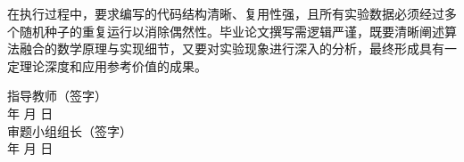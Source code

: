 \documentclass[UTF8,12pt,a4paper]{ctexart}
\begin{document}
在执行过程中，要求编写的代码结构清晰、复用性强，且所有实验数据必须经过多个随机种子的重复运行以消除偶然性。毕业论文撰写需逻辑严谨，既要清晰阐述算法融合的数学原理与实现细节，又要对实验现象进行深入的分析，最终形成具有一定理论深度和应用参考价值的成果。

\vspace{2em}
\begin{flushright}
指导教师（签字）\\[0.8em]
年    月    日\\[0.8em]
审题小组组长（签字）\\[0.8em]
年    月    日\\[0.8em]
\end{flushright}
\end{document}
